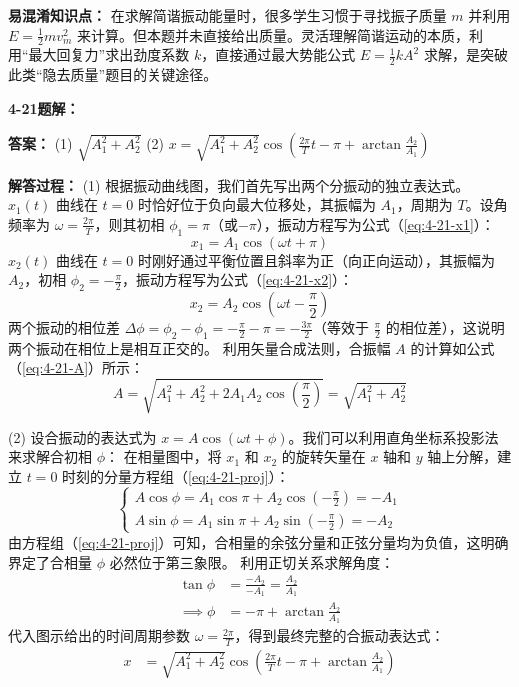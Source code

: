 \textbf{易混淆知识点： }
在求解简谐振动能量时，很多学生习惯于寻找振子质量 $m$ 并利用 $E = \frac{1}{2}mv_m^2$ 来计算。但本题并未直接给出质量。灵活理解简谐运动的本质，利用“最大回复力”求出劲度系数 $k$，直接通过最大势能公式 $E = \frac{1}{2}kA^2$ 求解，是突破此类“隐去质量”题目的关键途径。

\vspace{2em}

\textbf{4-21题解： }
\setcounter{equation}{0}
\renewcommand{\theHequation}{4-21.\arabic{equation}}

\textbf{答案： }
(1) $\sqrt{A_1^2 + A_2^2}$
(2) $x = \sqrt{A_1^2 + A_2^2} \cos\left(\frac{2\pi}{T} t - \pi + \arctan\frac{A_2}{A_1}\right)$

\textbf{解答过程： }
(1) 根据振动曲线图，我们首先写出两个分振动的独立表达式。
$x_1(t)$ 曲线在 $t=0$ 时恰好位于负向最大位移处，其振幅为 $A_1$，周期为 $T$。设角频率为 $\omega = \frac{2\pi}{T}$，则其初相 $\phi_1 = \pi$（或$-\pi$），振动方程写为公式（\ref{eq:4-21-x1}）：
\begin{equation}\label{eq:4-21-x1}
	x_1 = A_1 \cos(\omega t + \pi)
\end{equation}
$x_2(t)$ 曲线在 $t=0$ 时刚好通过平衡位置且斜率为正（向正向运动），其振幅为 $A_2$，初相 $\phi_2 = -\frac{\pi}{2}$，振动方程写为公式（\ref{eq:4-21-x2}）：
\begin{equation}\label{eq:4-21-x2}
	x_2 = A_2 \cos\left(\omega t - \frac{\pi}{2}\right)
\end{equation}
两个振动的相位差 $\Delta \phi = \phi_2 - \phi_1 = -\frac{\pi}{2} - \pi = -\frac{3\pi}{2}$（等效于 $\frac{\pi}{2}$ 的相位差），这说明两个振动在相位上是相互正交的。
利用矢量合成法则，合振幅 $A$ 的计算如公式（\ref{eq:4-21-A}）所示：
\begin{equation}\label{eq:4-21-A}
	A = \sqrt{A_1^2 + A_2^2 + 2A_1 A_2 \cos\left(\frac{\pi}{2}\right)} = \sqrt{A_1^2 + A_2^2}
\end{equation}

(2) 设合振动的表达式为 $x = A \cos(\omega t + \phi)$。我们可以利用直角坐标系投影法来求解合初相 $\phi$：
在相量图中，将 $x_1$ 和 $x_2$ 的旋转矢量在 $x$ 轴和 $y$ 轴上分解，建立 $t=0$ 时刻的分量方程组（\ref{eq:4-21-proj}）：
\begin{equation}\label{eq:4-21-proj}
	\begin{cases}
		A \cos\phi = A_1 \cos\pi + A_2 \cos\left(-\frac{\pi}{2}\right) = -A_1 \\
		A \sin\phi = A_1 \sin\pi + A_2 \sin\left(-\frac{\pi}{2}\right) = -A_2
	\end{cases}
\end{equation}
由方程组（\ref{eq:4-21-proj}）可知，合相量的余弦分量和正弦分量均为负值，这明确界定了合相量 $\phi$ 必然位于第三象限。
利用正切关系求解角度：
\begin{align*}
	\tan\phi &= \frac{-A_2}{-A_1} = \frac{A_2}{A_1} \\
	\implies \phi &= -\pi + \arctan\frac{A_2}{A_1}
\end{align*}
代入图示给出的时间周期参数 $\omega = \frac{2\pi}{T}$，得到最终完整的合振动表达式：
\begin{align*}
	x &= \sqrt{A_1^2 + A_2^2} \cos\left(\frac{2\pi}{T} t - \pi + \arctan\frac{A_2}{A_1}\right)
\end{align*}

